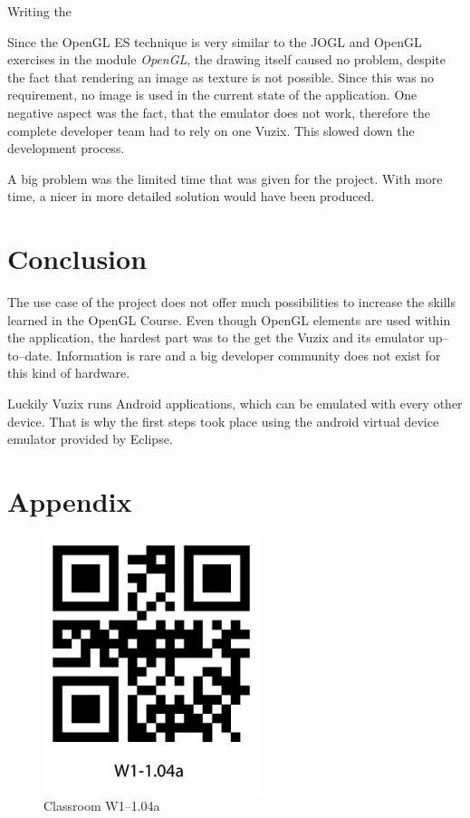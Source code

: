 \documentclass[11pt]{scrartcl}
\begin{document}
\begin{multicols}{2}
			Writing the 
			 
			 Since the OpenGL ES technique is very similar to the JOGL and OpenGL exercises in the module \emph{OpenGL}, the drawing itself caused no problem, despite the fact that rendering an image as texture is not possible. Since this was no requirement, no image is used in the current state of the application.  One negative aspect was the fact, that the emulator does not work, therefore the complete developer team had to rely on one Vuzix. This slowed down the development process.
			 
			 A big problem was the limited time that was given for the project.  With more time, a nicer in more detailed solution would have been produced.
			
	\section{Conclusion}
		The use case of the project does not offer much possibilities to increase the skills learned in the OpenGL Course. Even though OpenGL elements are used within the application, the hardest part was to the get the Vuzix and its emulator up--to--date. Information is rare and a big developer community does not exist for this kind of hardware.
		
		Luckily Vuzix runs Android applications, which can be emulated with every other device. That is why the first steps took place using the android virtual device emulator provided by Eclipse.
\end{multicols}




\section*{Appendix}
	\begin{figure}[htpb]
		\centering
		\includegraphics[height=7.5cm]{figure/qrcode_W1-104a}
		\caption{Classroom W1--1.04a\label{qrCodeW1-1.04a}}
	\end{figure}
	
\end{document}
